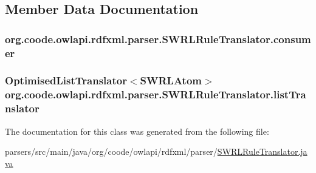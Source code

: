 \subsection{Member Data Documentation}
\hypertarget{classorg_1_1coode_1_1owlapi_1_1rdfxml_1_1parser_1_1_s_w_r_l_rule_translator_af28698752d12be9e486bd072505ac4f3}{
\subsubsection[{consumer}]{ org.\-coode.\-owlapi.\-rdfxml.\-parser.\-S\-W\-R\-L\-Rule\-Translator.\-consumer\hspace{0.3cm}{\ttfamily [private]}}}\label{classorg_1_1coode_1_1owlapi_1_1rdfxml_1_1parser_1_1_s_w_r_l_rule_translator_af28698752d12be9e486bd072505ac4f3}
\hypertarget{classorg_1_1coode_1_1owlapi_1_1rdfxml_1_1parser_1_1_s_w_r_l_rule_translator_a350f0d64a7670bd5c5be2a12800eb378}{
\subsubsection[{list\-Translator}]{\setlength{\rightskip}{0pt plus 5cm}Optimised\-List\-Translator$<${\bf S\-W\-R\-L\-Atom}$>$ org.\-coode.\-owlapi.\-rdfxml.\-parser.\-S\-W\-R\-L\-Rule\-Translator.\-list\-Translator\hspace{0.3cm}{\ttfamily [private]}}}\label{classorg_1_1coode_1_1owlapi_1_1rdfxml_1_1parser_1_1_s_w_r_l_rule_translator_a350f0d64a7670bd5c5be2a12800eb378}


The documentation for this class was generated from the following file\-:\begin{DoxyCompactItemize}
\item 
parsers/src/main/java/org/coode/owlapi/rdfxml/parser/\hyperlink{_s_w_r_l_rule_translator_8java}{S\-W\-R\-L\-Rule\-Translator.\-java}\end{DoxyCompactItemize}
